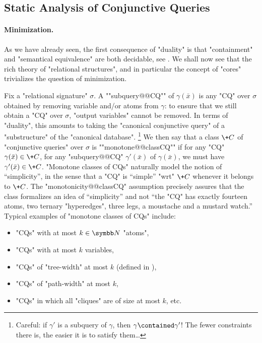 \subsection{Static Analysis of Conjunctive Queries}
\label{sec:prelim-db-static-analysis-cq}

\paragraph*{Minimization.}
As we have already seen, the first consequence of "duality" is that
"containment" and "semantical equivalence" are both
decidable, see .
We shall now see that the rich theory of "relational structures",
and in particular the concept of "cores" trivializes the question of minimization.

Fix a "relational signature" $\sigma$.
A ""subquery@@CQ"" of $\gamma(\bar x)$ is any "CQ" over $\sigma$
obtained by removing variable and/or atoms from $\gamma$:
to ensure that we still obtain a "CQ" over $\sigma$, "output variables" 
cannot be removed.
In terms of "duality", this amounts to taking the "canonical conjunctive query" of
a "substructure" of the "canonical database".%
\footnote{Careful: if $\gamma'$ is a subquery of $\gamma$, then $\gamma \contained \gamma'$!
The fewer constraints there is, the easier it is to satisfy them…}
We then say that a class $\+C$ of "conjunctive queries" over $\sigma$ is ""monotone@@classCQ""
if for any "CQ" $\gamma(\bar x) \in \+C$, for any "subquery@@CQ" $\gamma'(\bar x)$ of
$\gamma(\bar x)$, we must have $\gamma'(\bar x) \in \+C$.
"Monotone classes of CQs" naturally model the notion of ``simplicity'', in the sense that
a "CQ" is ``simple'' "wrt" $\+C$ whenever it belongs to $\+C$. The "monotonicity@@classCQ"
assumption precisely assures that the class formalizes an idea of ``simplicity''
and not ``the "CQ" has exactly fourteen atoms, two ternary "hyperedges", three legs,
a moustache and a mustard watch.''
Typical examples of "monotone classes of CQs" include:
\begin{itemize}
	\item "CQs" with at most $k \in \N$ "atoms",
	\item "CQs" with at most $k$ variables,
	\item "CQs" of "tree-width" at most $k$ (defined in ),
	\item "CQs" of "path-width" at most $k$,
	\item "CQs" in which all "cliques" are of size at most $k$, etc.
\end{itemize}

